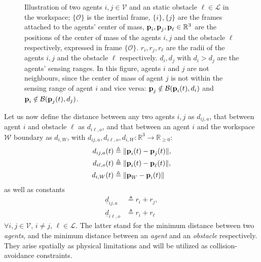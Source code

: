 \begin{figure}[ht!]
	\centering
    
    \caption{Illustration of two agents $i, j \in \mathcal{V}$ and an static
      obstacle $\ell \in \mathcal{L}$ in the workspace; $\{\mathcal{O}\}$ is the inertial
      frame, $\{i\}, \{j\}$ are the frames attached to the agents' center of
      mass, $\bm{\mathbf{p}}_i, \bm{\mathbf{p}}_j, \bm{\mathbf{p}}_{\ell} \in \mathbb{R}^3$ are the
      positions of the center of mass of the agents $i,j$ and the
      obstacle $\ell$ respectively, expressed in frame
      $\{\mathcal{O}\}$. $r_i, r_j, r_{\ell}$ are the radii of the agents $i,j$
      and the obstacle $\ell$ respectively. $d_i, d_j$ with
      $d_i > d_j$ are the agents' sensing ranges.
      In this figure, agents $i$ and $j$ are not neighbours, since the center
      of mass of agent $j$ is not within the sensing range of agent $i$ and vice
      versa: $\bm{\mathbf{p}}_j \notin \mathcal{B}(\bm{\mathbf{p}}_i(t), d_i)$ and
      $\bm{\mathbf{p}}_i \notin \mathcal{B}(\bm{\mathbf{p}}_j(t), d_j)$.}
	\label{fig:two_agents_one_obstacle}
\end{figure}

Let us now define the distance between any two agents $i,j$ as
$d_{ij,a}$, that between agent $i$ and obstacle $\ell$ as $d_{i\ell,o}$,
and that between an agent $i$ and the workspace $\mathcal{W}$ boundary as
$d_{i,W}$, with $d_{ij,a}, d_{i\ell,o}, d_{i,W} : \mathbb{R}^3 \to \mathbb{R}_{\geq 0}$:
\begin{subequations}
	\begin{align}
    d_{ij,a}(t) &\triangleq \| \bm{\mathbf{p}}_i(t) - \bm{\mathbf{p}}_j(t) \|, \\
    d_{i\ell,o}(t) &\triangleq \| \bm{\mathbf{p}}_i(t) - \bm{\mathbf{p}}_\ell(t) \|, \\
    d_{i,W}(t) &\triangleq \| \bm{\mathbf{p}}_W - \bm{\mathbf{p}}_i(t) \|
	\end{align}
\end{subequations}
as well as constants
\begin{subequations}
	\begin{align}
    \underline{d}_{ij, a} &\triangleq r_{i} + r_{j}, \\
    \underline{d}_{i\ell, o} &\triangleq r_{i} + r_{\ell}
	\end{align}
\end{subequations}
$\forall i, j \in \mathcal{V}$, $i \neq j$, $\ell \in \mathcal{L}$.
The latter stand for the minimum distance between two \textit{agents}, and the
minimum distance between an \textit{agent} and an \textit{obstacle}
respectively. They arise spatially as physical limitations and will be utilized
as collision-avoidance constraints.\\

